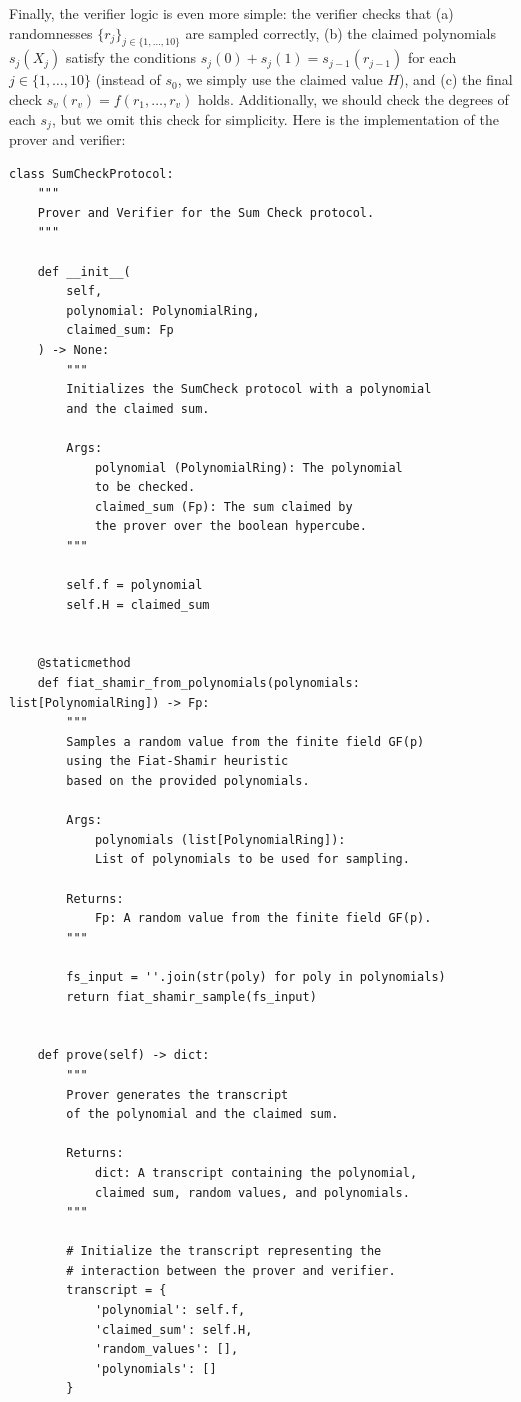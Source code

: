 \documentclass[../../book.tex]{subfiles}
\begin{document}
Finally, the verifier logic is even more simple: the verifier checks that (a)
randomnesses $\{r_j\}_{j \in \{1,\dots,10\}}$ are sampled correctly, (b) the
claimed polynomials $s_j(X_j)$ satisfy the conditions $s_j(0) + s_j(1) =
s_{j-1}(r_{j-1})$ for each $j \in \{1,\dots,10\}$ (instead of $s_0$, we simply
use the claimed value $H$), and (c) the final check $s_v(r_v) =
f(r_1,\dots,r_v)$ holds. Additionally, we should check the degrees of each
$s_j$, but we omit this check for simplicity. Here is the implementation of the
prover and verifier:
\begin{verbatim}
class SumCheckProtocol:
    """
    Prover and Verifier for the Sum Check protocol.
    """

    def __init__(
        self, 
        polynomial: PolynomialRing, 
        claimed_sum: Fp
    ) -> None:
        """
        Initializes the SumCheck protocol with a polynomial
        and the claimed sum.

        Args:
            polynomial (PolynomialRing): The polynomial 
            to be checked.
            claimed_sum (Fp): The sum claimed by 
            the prover over the boolean hypercube.
        """

        self.f = polynomial
        self.H = claimed_sum


    @staticmethod
    def fiat_shamir_from_polynomials(polynomials: list[PolynomialRing]) -> Fp:
        """
        Samples a random value from the finite field GF(p) 
        using the Fiat-Shamir heuristic
        based on the provided polynomials.

        Args:
            polynomials (list[PolynomialRing]): 
            List of polynomials to be used for sampling.

        Returns:
            Fp: A random value from the finite field GF(p).
        """
        
        fs_input = ''.join(str(poly) for poly in polynomials)
        return fiat_shamir_sample(fs_input)


    def prove(self) -> dict:
        """
        Prover generates the transcript 
        of the polynomial and the claimed sum.

        Returns:
            dict: A transcript containing the polynomial, 
            claimed sum, random values, and polynomials.
        """

        # Initialize the transcript representing the 
        # interaction between the prover and verifier.
        transcript = {
            'polynomial': self.f,
            'claimed_sum': self.H,
            'random_values': [],
            'polynomials': []
        }


\end{verbatim}
\end{document}

